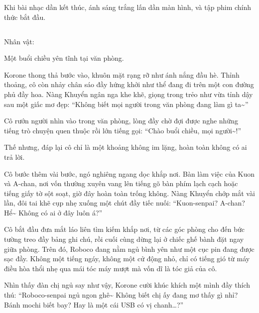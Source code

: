\documentclass[../main.tex]{subfiles}
\begin{document}
Khi bài nhạc dần kết thúc, ánh sáng trắng lấn dần màn hình, và tập phim chính thức bắt đầu.

\newpage

\subsection*{\label{ep-C2.II}}
\begin{center}
  {\caviar\fontsize{12pt}{12pt}\selectfont Nhân vật:    }
\end{center}

Một buổi chiều yên tĩnh tại văn phòng.

Korone thong thả bước vào, khuôn mặt rạng rỡ như ánh nắng đầu hè. Thỉnh thoảng, cô còn nhảy chân sáo đầy hứng khởi như thể đang đi trên một con đường phủ đầy hoa. Nàng Khuyển ngân nga khe khẽ, giọng trong trẻo như vừa tỉnh dậy sau một giấc mơ đẹp: ``Không biết mọi người trong văn phòng đang làm gì ta\~{}''

Cô rướn người nhìn vào trong văn phòng, lòng đầy chờ đợi được nghe những tiếng trò chuyện quen thuộc rồi lớn tiếng gọi: ``Chào buổi chiều, mọi người\~{}!''

Thế nhưng, đáp lại cô chỉ là một khoảng không im lặng, hoàn toàn không có ai trả lời.

Cô bước thêm vài bước, ngó nghiêng ngang dọc khắp nơi. Bàn làm việc của Kuon và A-chan, nơi vốn thường xuyên vang lên tiếng gõ bàn phím lạch cạch hoặc tiếng giấy tờ sột soạt, giờ đây hoàn toàn trống không. Nàng Khuyển chớp mắt vài lần, đôi tai khẽ cụp nhẹ xuống một chút đầy tiếc nuối: ``Kuon-senpai? A-chan? Hể\~{} Không có ai ở đây luôn á?''

Cô bắt đầu đưa mắt láo liên tìm kiếm khắp nơi, từ các góc phòng cho đến bức tường treo đầy bảng ghi chú, rồi cuối cùng dừng lại ở chiếc ghế bành đặt ngay giữa phòng. Trên đó, Roboco đang nằm ngủ bình yên như một cục pin đang được sạc đầy. Không một tiếng ngáy, không một cử động nhỏ, chỉ có tiếng gió từ máy điều hòa thổi nhẹ qua mái tóc máy mượt mà vốn dĩ là tóc giả của cô.


Nhìn thấy đàn chị ngủ say như vậy, Korone cười khúc khích một mình đầy thích thú: ``Roboco-senpai ngủ ngon ghê\~{} Không biết chị ấy đang mơ thấy gì nhỉ? Bánh mochi biết bay? Hay là một cái USB có vị chanh\dots?''
\end{document}
